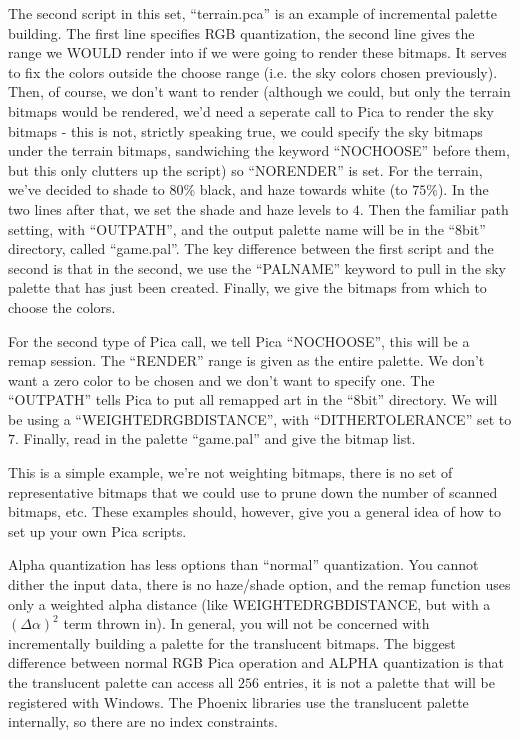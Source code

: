 \newpar The second script in this set, ``terrain.pca'' is an example of incremental
palette building. The first line specifies RGB quantization, the second line gives the
range we WOULD render into if we were going to render these bitmaps. It serves to fix
the colors outside the choose range (i.e. the sky colors chosen previously). Then, of course,
we don't want to render (although we could, but only the terrain bitmaps would be rendered,
we'd need a seperate call to Pica to render the sky bitmaps - this is not, strictly speaking
true, we could specify the sky bitmaps under the terrain bitmaps, sandwiching the keyword
``NOCHOOSE'' before them, but this only clutters up the script) so ``NORENDER'' is set. For the
terrain, we've decided to shade to $80\%$ black, and haze towards white (to $75\%$). In 
the two lines after that, we set the shade and haze levels to $4$. Then the familiar 
path setting, with ``OUTPATH'', and the output palette name will be in the ``8bit'' directory,
called ``game.pal''. The key difference between the first script and the second is that in
the second, we use the ``PALNAME'' keyword to pull in the sky palette that has just been
created. Finally, we give the bitmaps from which to choose the colors.

\newpar For the second type of Pica call, we tell Pica ``NOCHOOSE'', this will be a 
remap session. The ``RENDER'' range is given as the entire palette. We don't want a
zero color to be chosen and we don't want to specify one. The ``OUTPATH'' tells Pica
to put all remapped art in the ``8bit'' directory. We will be using a ``WEIGHTEDRGBDISTANCE'',
with ``DITHERTOLERANCE'' set to $7$. Finally, read in the palette ``game.pal'' and give the
bitmap list.

\newpar This is a simple example, we're not weighting bitmaps, there is no set of 
representative bitmaps that we could use to prune down the number of scanned bitmaps, 
etc. These examples should, however, give you a general idea of how to set up your own
Pica scripts.


\newpar Alpha quantization has less options than ``normal'' quantization. You cannot
dither the input data, there is no haze/shade option, and the remap function uses only a 
weighted alpha distance (like 
WEIGHTEDRGBDISTANCE, but with a $(\Delta \alpha)^2$ term thrown in). In general, you
will not be concerned with incrementally building a palette for the translucent bitmaps.
The biggest difference between normal RGB Pica operation and ALPHA quantization is that the
translucent palette can access all $256$ entries, it is not a palette that will
be registered with Windows. The Phoenix libraries use the translucent palette internally, 
so there are no index constraints. 


